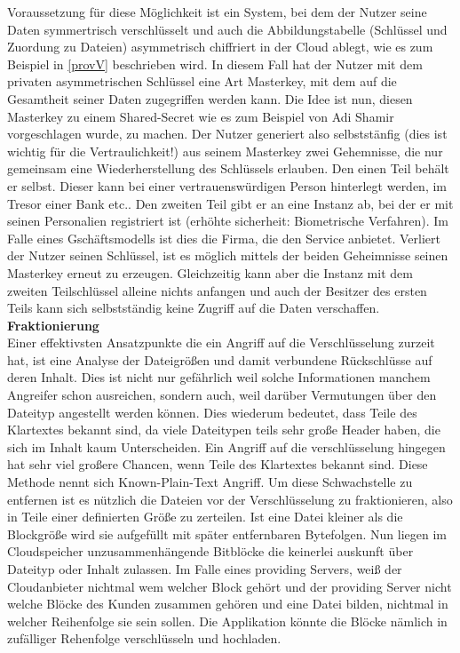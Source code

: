 \documentclass[12pt,a4paper,bibliography=totocnumbered,listof=totocnumbered]{scrartcl}
\begin{document}
Voraussetzung für diese Möglichkeit ist ein System, bei dem der Nutzer seine Daten symmertrisch verschlüsselt und auch die Abbildungstabelle (Schlüssel und Zuordung zu Dateien) asymmetrisch chiffriert in der Cloud ablegt, wie es zum Beispiel in \ref{provV} beschrieben wird. In diesem Fall hat der Nutzer mit dem privaten asymmetrischen Schlüssel eine Art Masterkey, mit dem auf die Gesamtheit seiner Daten zugegriffen werden kann. Die Idee ist nun, diesen Masterkey zu einem Shared-Secret wie es zum Beispiel von Adi Shamir vorgeschlagen wurde, zu machen. Der Nutzer generiert also selbststänfig (dies ist wichtig für die Vertraulichkeit!) aus seinem Masterkey zwei Gehemnisse, die nur gemeinsam eine Wiederherstellung des Schlüssels erlauben. Den einen Teil behält er selbst. Dieser kann bei einer vertrauenswürdigen Person hinterlegt werden, im Tresor einer Bank etc.. Den zweiten Teil gibt er an eine Instanz ab, bei der er mit seinen Personalien registriert ist (erhöhte sicherheit: Biometrische Verfahren). Im Falle eines Gschäftsmodells ist dies die Firma, die den Service anbietet. Verliert der Nutzer seinen Schlüssel, ist es möglich mittels der beiden Geheimnisse seinen Masterkey erneut zu erzeugen. Gleichzeitig kann aber die Instanz mit dem zweiten Teilschlüssel alleine nichts anfangen und auch der Besitzer des ersten Teils kann sich selbstständig keine Zugriff auf die Daten verschaffen.\cite{11}
\\\textbf{Fraktionierung}\\
Einer effektivsten Ansatzpunkte die ein Angriff auf die Verschlüsselung zurzeit hat, ist eine Analyse der Dateigrößen und damit verbundene Rückschlüsse auf deren Inhalt. Dies ist nicht nur gefährlich weil solche Informationen manchem Angreifer schon ausreichen, sondern auch, weil darüber Vermutungen über den Dateityp angestellt werden können. Dies wiederum bedeutet, dass Teile des Klartextes bekannt sind, da viele Dateitypen teils sehr große Header haben, die sich im Inhalt kaum Unterscheiden. Ein Angriff auf die verschlüsselung hingegen hat sehr viel großere Chancen, wenn Teile des Klartextes bekannt sind. Diese Methode nennt sich Known-Plain-Text Angriff. Um diese Schwachstelle zu entfernen ist es nützlich die Dateien vor der Verschlüsselung zu fraktionieren, also in Teile einer definierten Größe zu zerteilen. Ist eine Datei kleiner als die Blockgröße wird sie aufgefüllt mit später entfernbaren Bytefolgen. Nun liegen im Cloudspeicher unzusammenhängende Bitblöcke die keinerlei auskunft über Dateityp oder Inhalt zulassen. Im Falle eines providing Servers, weiß der Cloudanbieter nichtmal wem welcher Block gehört und der providing Server nicht welche Blöcke des Kunden zusammen gehören und eine Datei bilden, nichtmal in welcher Reihenfolge sie sein sollen. Die Applikation könnte die Blöcke nämlich in zufälliger Rehenfolge verschlüsseln und hochladen.
\end{document}
